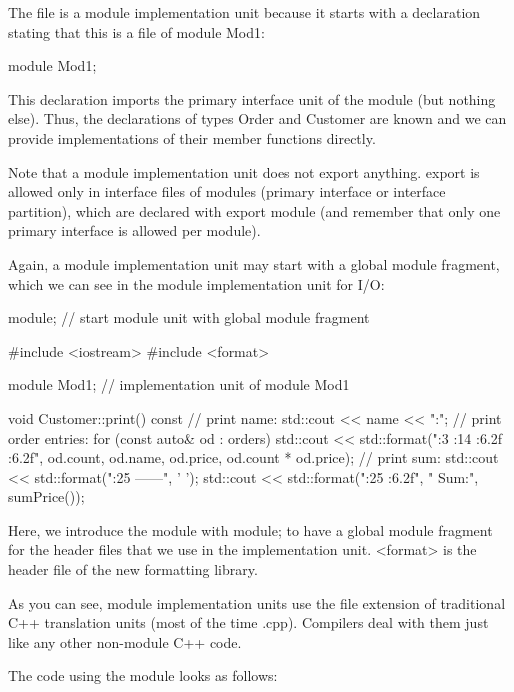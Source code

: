 The file is a module implementation unit because it starts with a declaration stating that this is a file of module Mod1:

\begin{cpp}
module Mod1;
\end{cpp}

This declaration imports the primary interface unit of the module (but nothing else). Thus, the declarations of types Order and Customer are known and we can provide implementations of their member functions directly.

Note that a module implementation unit does not export anything. export is allowed only in interface files of modules (primary interface or interface partition), which are declared with export module (and remember that only one primary interface is allowed per module).

Again, a module implementation unit may start with a global module fragment, which we can see in the module implementation unit for I/O:


\begin{cpp}
module; // start module unit with global module fragment

#include <iostream>
#include <format>

module Mod1; // implementation unit of module Mod1

void Customer::print() const
{
	// print name:
	std::cout << name << ":\n";
	// print order entries:
	for (const auto& od : orders) {
		std::cout << std::format("{:3} {:14} {:6.2f} {:6.2f}\n",
								  od.count, od.name, od.price, od.count * od.price);
	}
	// print sum:
	std::cout << std::format("{:25} ------\n", ' ');
	std::cout << std::format("{:25} {:6.2f}\n", " Sum:", sumPrice());
}
\end{cpp}

Here, we introduce the module with module; to have a global module fragment for the header files that we use in the implementation unit. <format> is the header file of the new formatting library.

As you can see, module implementation units use the file extension of traditional C++ translation units (most of the time .cpp). Compilers deal with them just like any other non-module C++ code.


The code using the module looks as follows:


